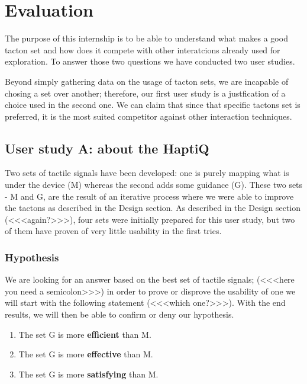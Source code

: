\chapter{Evaluation}

The purpose of this internship is to be able to understand what makes a good tacton set and how does it compete with other interatcions already used for exploration. To answer those two questions we have conducted two user studies.

Beyond simply gathering data on the usage of tacton sets, we are incapable of chosing a set over another; therefore, our first user study is a justfication of a choice used in the second one. We can claim that since that specific tactons set is preferred, it is the most suited competitor against other interaction techniques.

\section{User study A: about the HaptiQ}\label{user-study-a-about-the-haptiq}

Two sets of tactile signals have been developed: one is purely mapping what is under the device (M) whereas the second adds some guidance (G). These two sets - M and G, are the result of an iterative process where we were able to improve the tactons as described in the Design section. As described in the Design section (<<<again?>>>), four sets were initially prepared for this user study, but two of them have proven of very little usability in the first tries.

\subsection{Hypothesis}\label{hypothesis}

We are looking for an answer based on the best set of tactile signals; (<<<here you need a semicolon>>>) in order to prove or disprove the usability of one we will start with the following statement (<<<which one?>>>). With the end results, we will then be able to confirm or deny our hypothesis.

\begin{enumerate}
\def\labelenumi{\arabic{enumi}.}
\item
  The set G is more \textbf{efficient} than M.
\item
  The set G is more \textbf{effective} than M.
\item
  The set G is more \textbf{satisfying} than M.
\end{enumerate}

